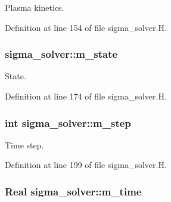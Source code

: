 Plasma kinetics. 



Definition at line 154 of file sigma\+\_\+solver.\+H.

\subsubsection[{\texorpdfstring{m\+\_\+state}{m_state}}]{ sigma\+\_\+solver\+::m\+\_\+state\hspace{0.3cm}{\ttfamily [protected]}}\hypertarget{classsigma__solver_ad582336a89e3cd2efc764867c07396a8}{}\label{classsigma__solver_ad582336a89e3cd2efc764867c07396a8}


State. 



Definition at line 174 of file sigma\+\_\+solver.\+H.

\subsubsection[{\texorpdfstring{m\+\_\+step}{m_step}}]{\setlength{\rightskip}{0pt plus 5cm}int sigma\+\_\+solver\+::m\+\_\+step\hspace{0.3cm}{\ttfamily [protected]}}\hypertarget{classsigma__solver_a978ed53b9a12d3bc4208571a1188739e}{}\label{classsigma__solver_a978ed53b9a12d3bc4208571a1188739e}


Time step. 



Definition at line 199 of file sigma\+\_\+solver.\+H.

\subsubsection[{\texorpdfstring{m\+\_\+time}{m_time}}]{\setlength{\rightskip}{0pt plus 5cm}Real sigma\+\_\+solver\+::m\+\_\+time\hspace{0.3cm}{\ttfamily [protected]}}\hypertarget{classsigma__solver_af19bc850b8006af7a7b4533dc267953d}{}\label{classsigma__solver_af19bc850b8006af7a7b4533dc267953d}


